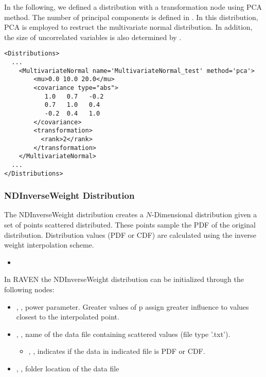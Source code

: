 In the following, we defined a distribution with a transformation node using PCA method. The number of principal components is
defined in . In this distribution, PCA is employed to restruct the multivariate normal distribution. In addition,
the size of uncorrelated variables is also determined by .

\begin{lstlisting}[style=XML]
<Distributions>
  ...
    <MultivariateNormal name='MultivariateNormal_test' method='pca'>
        <mu>0.0 10.0 20.0</mu>
        <covariance type="abs">
           1.0   0.7   -0.2
           0.7   1.0   0.4
           -0.2  0.4   1.0
        </covariance>
        <transformation>
          <rank>2</rank>
        </transformation>
    </MultivariateNormal>
  ...
</Distributions>
\end{lstlisting}

\subsubsection{NDInverseWeight Distribution}
\label{NDInverseWeight}
The NDInverseWeight distribution creates a $N$-Dimensional distribution given a set of points
scattered distributed. These points sample the PDF of the original distribution.
Distribution values (PDF or CDF) are calculated using the inverse weight
interpolation scheme.

%
\attrsIntro
\vspace{-5mm}
\begin{itemize}
\itemsep0em
\item \nameDescription
\end{itemize}
\vspace{-5mm}


In RAVEN the NDInverseWeight distribution can be initialized through the following nodes:
\begin{itemize}
\item {}, , power parameter. Greater values of p assign greater influence to values closest to the interpolated point.
\item {}, ,  name of the data file containing scattered values (file type '.txt').
\begin{itemize}
\item {}, ,  indicates if the data in indicated file is PDF or CDF.
\end{itemize}
\item {}, , folder location of the data file
\end{itemize}

